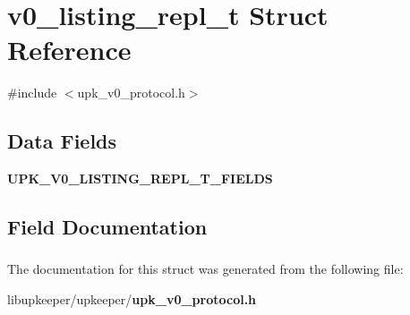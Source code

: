 \section{v0\_\-listing\_\-repl\_\-t Struct Reference}
\label{structv0__listing__repl__t}


{\ttfamily \#include $<$upk\_\-v0\_\-protocol.h$>$}

\subsection*{Data Fields}
\begin{DoxyCompactItemize}
\item 
{\bf UPK\_\-V0\_\-LISTING\_\-REPL\_\-T\_\-FIELDS}
\end{DoxyCompactItemize}


\subsection{Field Documentation}
\subsubsection[{UPK\_\-V0\_\-LISTING\_\-REPL\_\-T\_\-FIELDS}]{}\label{structv0__listing__repl__t_a00a61796d29a5c60a9826213f10c95ea}


The documentation for this struct was generated from the following file:\begin{DoxyCompactItemize}
\item 
libupkeeper/upkeeper/{\bf upk\_\-v0\_\-protocol.h}\end{DoxyCompactItemize}
